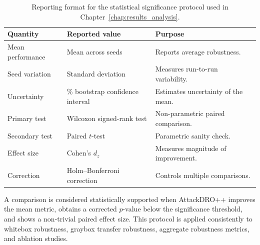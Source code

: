 \begin{table}[H]
\centering
\caption[Statistical reporting format]{Reporting format for the statistical significance protocol used in Chapter~\ref{chap:results_analysis}.}
\label{tab:ch5_statistical_reporting_format}
\footnotesize
\setlength{\tabcolsep}{4pt}
\renewcommand{\arraystretch}{1.08}
\begin{tabularx}{\textwidth}{@{}
>{\raggedright\arraybackslash}p{}
>{\raggedright\arraybackslash}p{}
>{\raggedright\arraybackslash}X
@{}}
\toprule
Quantity & Reported value & Purpose \\
\midrule

Mean performance
& Mean across seeds
& Reports average robustness. \\

Seed variation
& Standard deviation
& Measures run-to-run variability. \\

Uncertainty
& 95\% bootstrap confidence interval
& Estimates uncertainty of the mean. \\

Primary test
& Wilcoxon signed-rank test
& Non-parametric paired comparison. \\

Secondary test
& Paired $t$-test
& Parametric sanity check. \\

Effect size
& Cohen's $d_z$
& Measures magnitude of improvement. \\

Correction
& Holm--Bonferroni correction
& Controls multiple comparisons. \\

\bottomrule
\end{tabularx}
\end{table}

A comparison is considered statistically supported when AttackDRO++ improves the mean metric, obtains a corrected $p$-value below the significance threshold, and shows a non-trivial paired effect size. This protocol is applied consistently to whitebox robustness, graybox transfer robustness, aggregate robustness metrics, and ablation studies.
